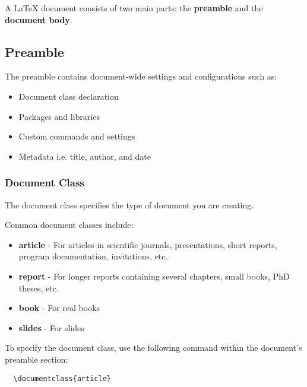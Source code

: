 \documentclass[12pt]{article}
\begin{document}
  A LaTeX document consists of two main parts: the \textbf{preamble} and the \textbf{document body}. 


  \subsection{Preamble}
  \label{sec:preamble}

  The preamble contains document-wide settings and configurations such as:

  \begin{itemize}
    \item Document class declaration
    \item Packages and libraries
    \item Custom commands and settings
    \item Metadata i.e. title, author, and date
  \end{itemize}


  \subsubsection{Document Class}
  \label{sec:document-class}

  The document class specifies the type of document you are creating. 
  
  Common document classes include:  

  \begin{itemize}
    \item \textbf{article} - For articles in scientific journals, presentations, short reports, program documentation, invitations, etc.
    \item \textbf{report} - For longer reports containing several chapters, small books, PhD theses, etc.
    \item \textbf{book} - For real books
    \item \textbf{slides} - For slides
  \end{itemize}

  To specify the document class, use the following command within the document's preamble section:

  \begin{verbatim}
  \documentclass{article}
  \end{verbatim}
\end{document}
